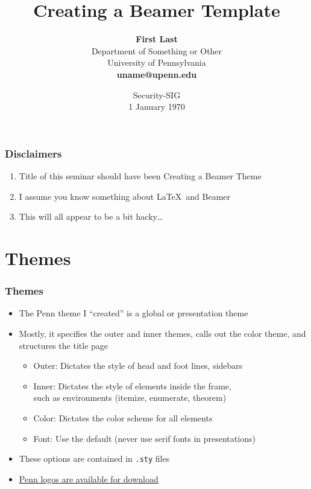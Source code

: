 \documentclass[xcolor=table]{beamer}
\title[Beamer Themes]{\textbf{Creating a Beamer Template}}
\author[F Last]{\textbf{First Last} \\ 
	{\small Department of Something or Other} \\
	{\small University of Pennsylvania} \\
	 \textbf{uname@upenn.edu }}
\institute[uname@upenn.edu]{}
\date[1 January 1970]{Security-SIG \\ 1 January 1970 }
\begin{document}
\frame[plain]{\titlepage}

\setcounter{framenumber}{0}

\begin{frame}
\tableofcontents
\end{frame}

\begin{frame}
\frametitle{Disclaimers}
\begin{enumerate}
\item<1-> Title of this seminar should have been Creating a Beamer Theme
\medskip
\item<2-> I assume you know something about \LaTeX~and Beamer
\medskip
\item<3-> This will all appear to be a bit hacky\ldots
\end{enumerate}
\end{frame}

\section{Themes}
\begin{frame}
\frametitle{Themes}
\begin{itemize}
\item The Penn theme I ``created'' is a \textcolor{quakerblue}{global} or \textcolor{quakerblue}{presentation} theme 
\smallskip
\item Mostly, it specifies the \textcolor{quakerblue}{outer} and \textcolor{quakerblue}{inner} themes, calls out the \textcolor{quakerblue}{color} theme, and structures the title page \\
\begin{itemize}
\item \textcolor{quakerblue}{Outer}: Dictates the style of head and foot lines, sidebars
\item \textcolor{quakerblue}{Inner}: Dictates the style of elements inside the frame, \\ such as environments (itemize, enumerate, theorem)
\item \textcolor{quakerblue}{Color}: Dictates the color scheme for all elements
\item \textcolor{quakerblue}{Font}: Use the default (never use serif fonts in presentations)
\end{itemize}
\smallskip
\item These options are contained in \texttt{.sty} files
\smallskip
\item \href{http://www.upenn.edu/webservices/styleguide/logo.html}{\alert{Penn logos are available for download}}
\end{itemize}
\end{frame}
\end{document}
